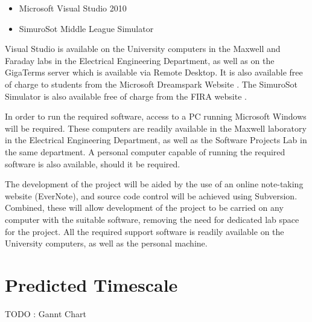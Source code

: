 \documentclass[a4paper,10pt]{article}
\begin{document}
\begin{itemize}
 \item Microsoft Visual Studio 2010
 \item SimuroSot Middle League Simulator
\end{itemize}

Visual Studio is available on the University computers in the Maxwell and Faraday labs in the Electrical Engineering Department, as well as on the GigaTerms server which is available via Remote Desktop.  It is also available free of charge to students from the Microsoft Dreamspark Website \cite{dreamsparkVS}. The SimuroSot Simulator is also available free of charge from the FIRA website \cite{simurosotSim}.

In order to run the required software, access to a PC running Microsoft Windows will be required.  These computers are readily available in the Maxwell laboratory in the Electrical Engineering Department, as well as the Software Projects Lab in the same department.  A personal computer capable of running the required software is also available, should it be required.

The development of the project will be aided by the use of an online note-taking website (EverNote), and source code control will be achieved using Subversion.  Combined, these will allow development of the project to be carried on any computer with the suitable software, removing the need for dedicated lab space for the project.  All the required support software is readily available on the University computers, as well as the personal machine.

\section{Predicted Timescale}
TODO : Gannt Chart

\cleardoublepage

{}

\end{document}
